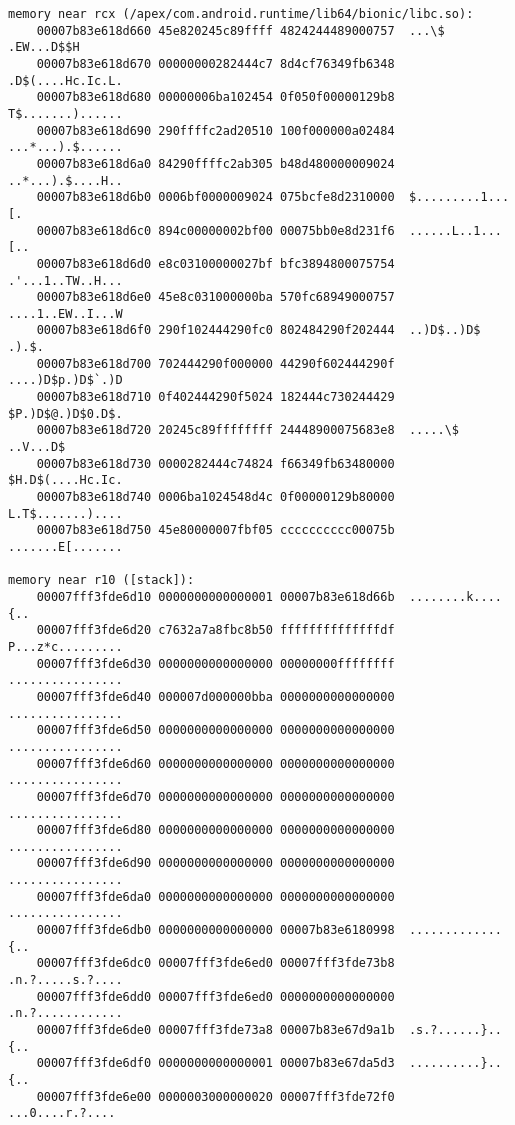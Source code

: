 \begin{lstlisting}
memory near rcx (/apex/com.android.runtime/lib64/bionic/libc.so):
    00007b83e618d660 45e820245c89ffff 4824244489000757  ...\$ .EW...D$$H
    00007b83e618d670 00000000282444c7 8d4cf76349fb6348  .D$(....Hc.Ic.L.
    00007b83e618d680 00000006ba102454 0f050f00000129b8  T$.......)......
    00007b83e618d690 290ffffc2ad20510 100f000000a02484  ...*...).$......
    00007b83e618d6a0 84290ffffc2ab305 b48d480000009024  ..*...).$....H..
    00007b83e618d6b0 0006bf0000009024 075bcfe8d2310000  $.........1...[.
    00007b83e618d6c0 894c00000002bf00 00075bb0e8d231f6  ......L..1...[..
    00007b83e618d6d0 e8c03100000027bf bfc3894800075754  .'...1..TW..H...
    00007b83e618d6e0 45e8c031000000ba 570fc68949000757  ....1..EW..I...W
    00007b83e618d6f0 290f102444290fc0 802484290f202444  ..)D$..)D$ .).$.
    00007b83e618d700 702444290f000000 44290f602444290f  ....)D$p.)D$`.)D
    00007b83e618d710 0f402444290f5024 182444c730244429  $P.)D$@.)D$0.D$.
    00007b83e618d720 20245c89ffffffff 24448900075683e8  .....\$ ..V...D$
    00007b83e618d730 0000282444c74824 f66349fb63480000  $H.D$(....Hc.Ic.
    00007b83e618d740 0006ba1024548d4c 0f00000129b80000  L.T$.......)....
    00007b83e618d750 45e80000007fbf05 cccccccccc00075b  .......E[.......

memory near r10 ([stack]):
    00007fff3fde6d10 0000000000000001 00007b83e618d66b  ........k....{..
    00007fff3fde6d20 c7632a7a8fbc8b50 ffffffffffffffdf  P...z*c.........
    00007fff3fde6d30 0000000000000000 00000000ffffffff  ................
    00007fff3fde6d40 000007d000000bba 0000000000000000  ................
    00007fff3fde6d50 0000000000000000 0000000000000000  ................
    00007fff3fde6d60 0000000000000000 0000000000000000  ................
    00007fff3fde6d70 0000000000000000 0000000000000000  ................
    00007fff3fde6d80 0000000000000000 0000000000000000  ................
    00007fff3fde6d90 0000000000000000 0000000000000000  ................
    00007fff3fde6da0 0000000000000000 0000000000000000  ................
    00007fff3fde6db0 0000000000000000 00007b83e6180998  .............{..
    00007fff3fde6dc0 00007fff3fde6ed0 00007fff3fde73b8  .n.?.....s.?....
    00007fff3fde6dd0 00007fff3fde6ed0 0000000000000000  .n.?............
    00007fff3fde6de0 00007fff3fde73a8 00007b83e67d9a1b  .s.?......}..{..
    00007fff3fde6df0 0000000000000001 00007b83e67da5d3  ..........}..{..
    00007fff3fde6e00 0000003000000020 00007fff3fde72f0   ...0....r.?....


\end{lstlisting}
